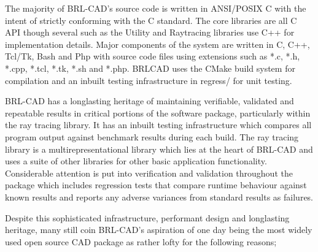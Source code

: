 \hspace{30} The   majority   of   BRL-­CAD's   source   code   is   written   in   ANSI/POSIX   C   with   the  
intent   of   strictly   conforming   with   the   C   standard.   The   core   libraries   are   all   C   API  
though   several   such   as   the   Utility   and   Ray­tracing   libraries   use   C++   for  
implementation   details.   Major   components   of   the   system   are   written   in   C,   C++,  
Tcl/Tk,   Bash   and   Php   with   source   code   files   using   extensions   such   as   *.c,   *.h,  
*.cpp,   *.tcl,   *.tk,   *.sh   and   *.php.   BRL­CAD   uses   the   CMake   build   system   for  
compilation and an inbuilt testing infrastructure in regress/ for unit testing.  

\hspace{30} BRL-­CAD   has   a   long­lasting   heritage   of   maintaining   verifiable,   validated  
and   repeatable   results   in   critical   portions   of   the   software   package,   particularly  
within   the   ray   tracing   library.   It   has   an   inbuilt   testing   infrastructure   which  
compares   all   program   output   against   benchmark   results   during   each   build.   The  
ray   tracing   library   is   a   multi­representational   library   which   lies   at   the   heart   of  
BRL­-CAD   and   uses   a   suite   of   other   libraries   for   other   basic   application  
functionality.   Considerable   attention   is   put   into   verification   and   validation  
throughout   the   package   which   includes   regression   tests   that   compare   runtime  
behaviour   against   known   results   and   reports   any   adverse   variances   from  
standard results as failures.  

\hspace{30} Despite   this   sophisticated   infrastructure,   performant   design   and  
long­lasting   heritage,   many   still   coin   BRL-­CAD's   aspiration   of   one   day   being   the  
most   widely   used   open   source   CAD   package   as   rather   lofty  
for the following reasons;

